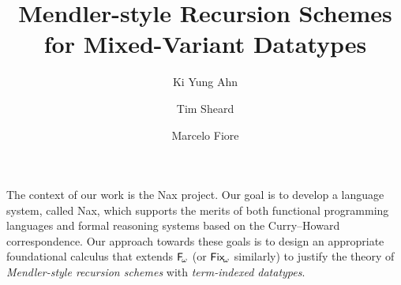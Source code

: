 \documentclass[a4paper]{easychair} %
\title{Mendler-style Recursion Schemes for Mixed-Variant Datatypes}
\author{
Ki Yung Ahn\inst{1}
\and
Tim Sheard\inst{1}
 \and
Marcelo Fiore\inst{2}
}
\institute{
  Portland State University~\thanks{supported by NSF grant 0910500.}
\and
  University of Cambridge
}
\newcommand{\Fw}[0]{{\ensuremath{\mathsf{\uppercase{F}}_{\!\omega}}}}
\newcommand{\Fixw}[0]{{\ensuremath{\mathsf{\uppercase{F}\lowercase{ix}}_{\!\omega}}}}
\begin{document}
\maketitle


The context of our work is the Nax project.
Our goal is to develop a language system, called Nax, which supports the merits of both
functional programming languages and formal reasoning systems based on
the Curry--Howard correspondence. Our approach towards these goals is to 
design an appropriate foundational calculus \cite{AhnSheFioPit13}
that extends \Fw \cite{Girard72} (or \Fixw \cite{AbeMat04} similarly) to justify
the theory of \emph{Mendler-style recursion schemes} \cite{Mendler87} with \emph{term-indexed datatypes}.
\end{document}
